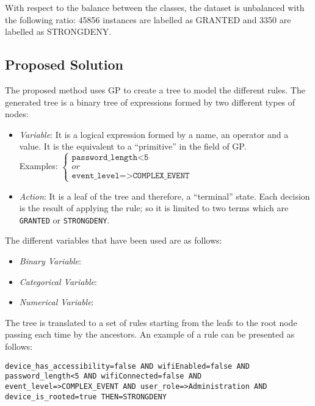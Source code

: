 \documentclass[runningheads,a4paper]{llncs}
\begin{document}
With respect to the balance between the classes, the dataset is unbalanced with the following ratio: 45856 instances are labelled as GRANTED and 3350 are labelled as STRONGDENY.

\subsection{Proposed Solution}
\label{subsec:solution}
The proposed method uses GP to create a tree to model the different rules. The generated tree
is a binary tree of expressions formed by two different types of nodes:

\begin{itemize}
\item {\em Variable}: It is a logical expression formed by a name, an operator and a value. It is the equivalent to a ``primitive'' in the field of GP. \\
    Examples:
   \begin{math}
     \left \{
   \begin{array}{l}
     \texttt{password\_length<5} \\
     or \\
      \texttt{event\_level=>COMPLEX\_EVENT}
   \end{array}
   \right .
   \end{math}
\item {\em Action}: It is a leaf of the   tree and therefore, a ``terminal'' state. Each decision is the result of applying the rule; so it is limited to two terms which are \texttt{GRANTED} or \texttt{STRONGDENY}.
\end{itemize}

The different variables that have been used are as follows:

\begin{itemize}
\item {\em Binary Variable}: %
\item {\em Categorical Variable}:
\item {\em Numerical Variable}:

\end{itemize}

The tree is translated to a set of rules starting from the leafs to the root node passing each time by the ancestors. An example of a rule can be presented as follows:

\begin{verbatim}
device_has_accessibility=false AND wifiEnabled=false AND
password_length<5 AND wifiConnected=false AND
event_level=>COMPLEX_EVENT AND user_role=>Administration AND
device_is_rooted=true THEN=STRONGDENY
\end{verbatim}
\end{document}
